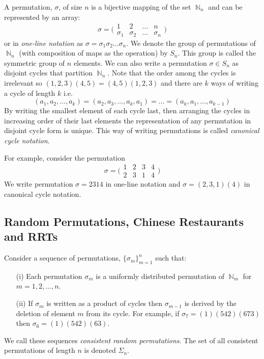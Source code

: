 \documentclass[oneside]{book} %
\theoremstyle{definition}
\numberwithin{equation}{section}
\DeclareMathOperator{\N}{\mathbb{N}}
\begin{document}
A permutation, $\sigma$, of size $n$ is a bijective mapping of the set  $\N_n$ and can be represented by an array:
\[
 \sigma  = \bigl(\begin{smallmatrix}
    1 & 2 & \dots & n \\
    \sigma_1 & \sigma_2 & \dots & \sigma_n
  \end{smallmatrix}\bigr)
\]
or in \emph{one-line notation} as $\sigma = \sigma_1\sigma_2\dots\sigma_n$.  We denote the group of permutations of $\N_n$
(with composition of maps as the operation) by $S_n$.  This group is called the symmetric group of $n$ elements. We can also write a permutation $\sigma \in S_n$ as disjoint cycles that partition $\N_n$.  Note that the order among the cycles is irrelevant so $(1,2,3)(4,5) = (4,5)(1,2,3)$ and there are $k$ ways of writing a cycle of length $k$ i.e.
\[
 (a_1,a_2,\dots,a_k) = (a_2,a_3,\dots,a_k,a_1) = \dots = (a_k,a_1,\dots,a_{k-1})
\]
By writing the smallest element of each cycle last, then arranging the cycles in increasing order of their last elements the representation of any permutation in disjoint cycle form is unique.  This way of writing permutations is called \emph{canonical cycle notation}.
 
For example, consider the permutation
\[
 \sigma  = \bigl(\begin{smallmatrix}
    1 & 2 & 3 & 4 \\
    2 & 3 & 1 & 4
  \end{smallmatrix}\bigr)
\]
We write permutation $\sigma = 2314$ in one-line notation and $\sigma  = (2,3,1)(4)$ in canonical cycle notation.

\subsection{Random Permutations, Chinese Restaurants and RRTs}
Consider a sequence of permutations, $\{\sigma_m\}_{m=1}^n$ such that:
\begin{itemize}
 \item[(i)] Each permutation $\sigma_m$ is a uniformly distributed permutation of $\N_m$ for $m = 1,2,\dots,n$.
 \item[(ii)] If $\sigma_m$ is written as a product of cycles then $\sigma_{m-1}$ is derived by the deletion of element $m$ from its cycle.  
 For example, if $\sigma_7 = (1)(542)(673)$  then 
$\sigma_6 = (1)(542)(63)$.
 \end{itemize}
We call these sequences \emph{consistent random permutations}.  The set of all consistent permutations of length $n$ is denoted $\Sigma_n$.  
\end{document}
